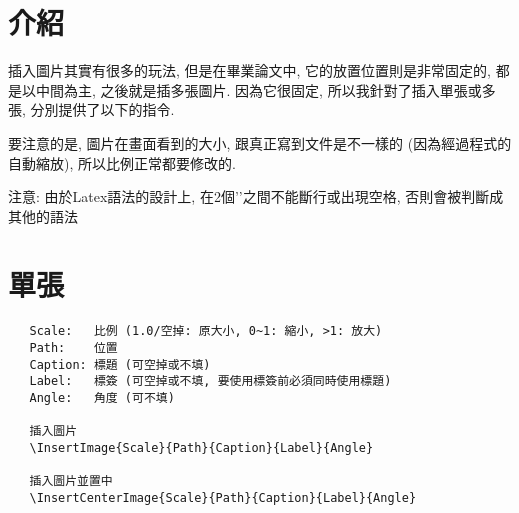 \section{介紹}

插入圖片其實有很多的玩法, 但是在畢業論文中, 它的放置位置則是非常固定的, 都是以中間為主, 之後就是插多張圖片. 因為它很固定, 所以我針對了插入單張或多張, 分別提供了以下的指令.

要注意的是, 圖片在畫面看到的大小, 跟真正寫到文件是不一樣的 (因為經過程式的自動縮放), 所以比例正常都要修改的.

注意: 由於Latex語法的設計上, 在2個'{}'之間不能斷行或出現空格, 否則會被判斷成其他的語法

\section{單張}

  \begin{framed}
  \begin{verbatim}
   Scale:   比例 (1.0/空掉: 原大小, 0~1: 縮小, >1: 放大)
   Path:    位置
   Caption: 標題 (可空掉或不填)
   Label:   標簽 (可空掉或不填, 要使用標簽前必須同時使用標題)
   Angle:   角度 (可不填)

   插入圖片
   \InsertImage{Scale}{Path}{Caption}{Label}{Angle}

   插入圖片並置中
   \InsertCenterImage{Scale}{Path}{Caption}{Label}{Angle}
  \end{verbatim}
  \end{framed}

  \newpage


